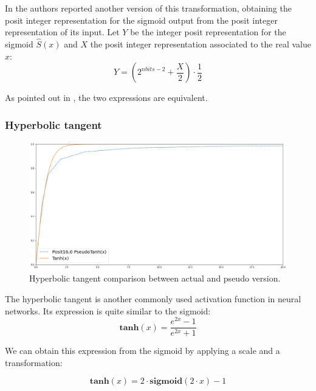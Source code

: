 In \cite{gustafson2017beating} the authors reported another version of this transformation, obtaining the posit integer representation for the sigmoid output from the posit integer representation of its input. Let $Y$ be the integer posit representation for the sigmoid $\hat{S}(x)$ and $X$ the posit integer representation associated to the real value $x$:
\begin{equation}\label{eqn:pseudoSigmoidPosit0}
    Y = \left ( 2^{nbits - 2} + \frac{X}{2} \right ) \cdot \frac{1}{2}
\end{equation}

As pointed out in \cite{coco2020sensors}, the two expressions are equivalent.

\subsubsection{Hyperbolic tangent}

\begin{figure}
    \centering
    \includegraphics[width=\linewidth]{img/tanhPosit160.png}
    \caption{Hyperbolic tangent comparison between actual and pseudo version.}
    \label{fig:pseudoTanhPosit0}
\end{figure}

The hyperbolic tangent is another commonly used activation function in neural networks. Its expression is quite similar to the sigmoid:
\begin{equation}
    \mathbf{tanh}(x) = \frac{e^{2x}-1}{e^{2x}+1} 
\end{equation}

We can obtain this expression from the sigmoid by applying a scale and a transformation:

\begin{equation}
   \mathbf{tanh}(x) =  2 \cdot \mathbf{sigmoid}(2 \cdot x) - 1
\end{equation}

